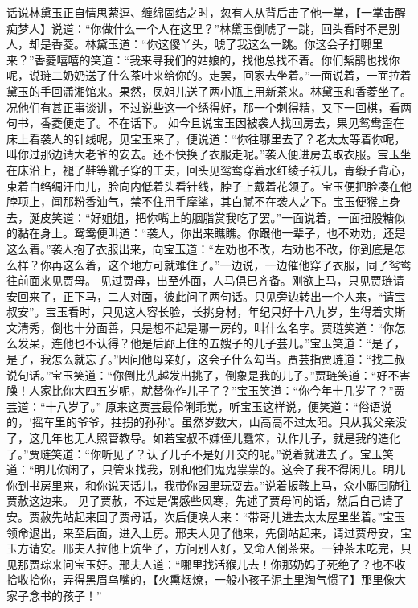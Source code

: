 \documentclass[12pt,oneside]{book}
\begin{document}
话说林黛玉正自情思萦逗、缠绵固结之时，忽有人从背后击了他一掌，【一掌击醒痴梦人】说道：“你做什么一个人在这里？”林黛玉倒唬了一跳，回头看时不是别人，却是香菱。林黛玉道：“你这傻丫头，唬了我这么一跳。你这会子打哪里来？”香菱嘻嘻的笑道：“我来寻我们的姑娘的，找他总找不着。你们紫鹃也找你呢，说琏二奶奶送了什么茶叶来给你的。走罢，回家去坐着。”一面说着，一面拉着黛玉的手回潇湘馆来。果然，凤姐儿送了两小瓶上用新茶来。林黛玉和香菱坐了。况他们有甚正事谈讲，不过说些这一个绣得好，那一个刺得精，又下一回棋，看两句书，香菱便走了。不在话下。
如今且说宝玉因被袭人找回房去，果见鸳鸯歪在床上看袭人的针线呢，见宝玉来了，便说道：“你往哪里去了？老太太等着你呢，叫你过那边请大老爷的安去。还不快换了衣服走呢。”袭人便进房去取衣服。宝玉坐在床沿上，褪了鞋等靴子穿的工夫，回头见鸳鸯穿着水红绫子袄儿，青缎子背心，束着白绉绸汗巾儿，脸向内低着头看针线，脖子上戴着花领子。宝玉便把脸凑在他脖项上，闻那粉香油气，禁不住用手摩挲，其白腻不在袭人之下。宝玉便猴上身去，涎皮笑道：“好姐姐，把你嘴上的胭脂赏我吃了罢。”一面说着，一面扭股糖似的黏在身上。鸳鸯便叫道：“袭人，你出来瞧瞧。你跟他一辈子，也不劝劝，还是这么着。”袭人抱了衣服出来，向宝玉道：“左劝也不改，右劝也不改，你到底是怎么样？你再这么着，这个地方可就难住了。”一边说，一边催他穿了衣服，同了鸳鸯往前面来见贾母。
见过贾母，出至外面，人马俱已齐备。刚欲上马，只见贾琏请安回来了，正下马，二人对面，彼此问了两句话。只见旁边转出一个人来，“请宝叔安”。宝玉看时，只见这人容长脸，长挑身材，年纪只好十八九岁，生得着实斯文清秀，倒也十分面善，只是想不起是哪一房的，叫什么名字。贾琏笑道：“你怎么发呆，连他也不认得？他是后廊上住的五嫂子的儿子芸儿。”宝玉笑道：“是了，是了，我怎么就忘了。”因问他母亲好，这会子什么勾当。贾芸指贾琏道：“找二叔说句话。”宝玉笑道：“你倒比先越发出挑了，倒象是我的儿子。”贾琏笑道：“好不害臊！人家比你大四五岁呢，就替你作儿子了？”宝玉笑道：“你今年十几岁了？”贾芸道：“十八岁了。”
原来这贾芸最伶俐乖觉，听宝玉这样说，便笑道：“俗语说的，‘摇车里的爷爷，拄拐的孙孙’。虽然岁数大，山高高不过太阳。只从我父亲没了，这几年也无人照管教导。如若宝叔不嫌侄儿蠢笨，认作儿子，就是我的造化了。”贾琏笑道：“你听见了？认了儿子不是好开交的呢。”说着就进去了。宝玉笑道：“明儿你闲了，只管来找我，别和他们鬼鬼祟祟的。这会子我不得闲儿。明儿你到书房里来，和你说天话儿，我带你园里玩耍去。”说着扳鞍上马，众小厮围随往贾赦这边来。
见了贾赦，不过是偶感些风寒，先述了贾母问的话，然后自己请了安。贾赦先站起来回了贾母话，次后便唤人来：“带哥儿进去太太屋里坐着。”宝玉领命退出，来至后面，进入上房。邢夫人见了他来，先倒站起来，请过贾母安，宝玉方请安。邢夫人拉他上炕坐了，方问别人好，又命人倒茶来。一钟茶未吃完，只见那贾琮来问宝玉好。邢夫人道：“哪里找活猴儿去！你那奶妈子死绝了？也不收拾收拾你，弄得黑眉乌嘴的，【火熏烟燎，一般小孩子泥土里淘气惯了】那里像大家子念书的孩子！”
\end{document}
